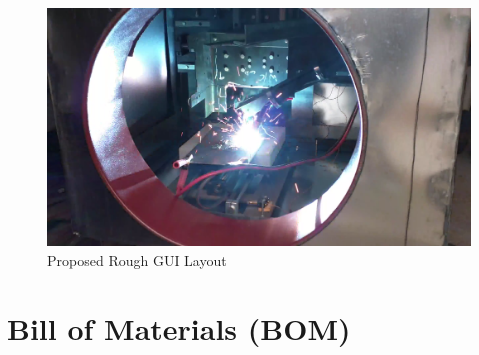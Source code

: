 \documentclass[12pt]{article}
\begin{document}
\begin{figure}[h]
\centering
\includegraphics[width=1\textwidth]{23}
\caption{Proposed Rough GUI Layout}
\end{figure}

\clearpage



\section{Bill of Materials (BOM)}
\end{document}
